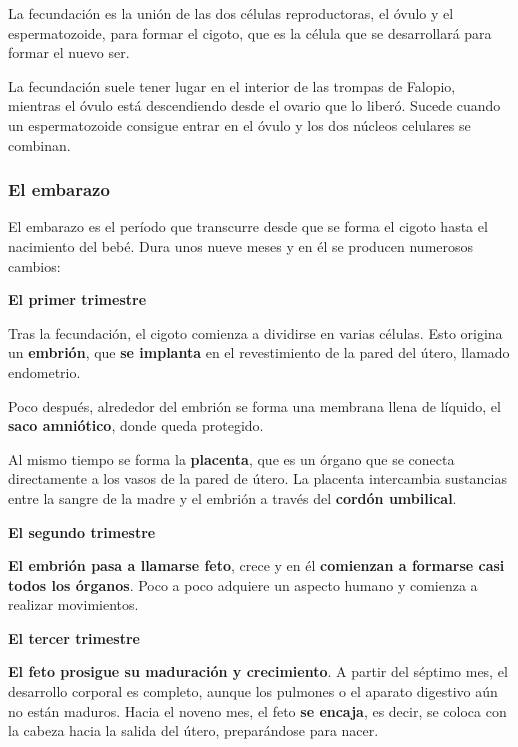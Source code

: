 La fecundación es la unión de las dos células reproductoras, el óvulo y el espermatozoide, para formar el cigoto, que es la célula que se desarrollará para formar el nuevo ser.

\vspace{3mm}
La fecundación suele tener lugar en el interior de las trompas de Falopio, mientras el óvulo está descendiendo desde el ovario que lo liberó. Sucede cuando un espermatozoide consigue entrar en el óvulo y los dos núcleos celulares se combinan.

\subsubsection{El embarazo}

El embarazo es el período que transcurre desde que se forma el cigoto hasta el nacimiento del bebé. Dura unos nueve meses y en él se producen numerosos cambios:

\vspace{3mm}
\textbf{El primer trimestre}

\vspace{3mm}
Tras la fecundación, el cigoto comienza a dividirse en varias células. Esto origina un \textbf{embrión}, que \textbf{se implanta} en el revestimiento de la pared del útero, llamado endometrio.

\vspace{3mm}
Poco después, alrededor del embrión se forma una membrana llena de líquido, el \textbf{saco amniótico}, donde queda protegido.

\vspace{3mm}
Al mismo tiempo se forma la \textbf{placenta}, que es un órgano que se conecta directamente a los vasos de la pared de útero. La placenta intercambia sustancias entre la sangre de la madre y el embrión a través del \textbf{cordón umbilical}.

\vspace{3mm}
\textbf{El segundo trimestre}

\vspace{3mm}
\textbf{El embrión pasa a llamarse feto}, crece y en él \textbf{comienzan a formarse casi todos los órganos}. Poco a poco adquiere un aspecto humano y comienza a realizar movimientos.

\vspace{3mm}
\textbf{El tercer trimestre}

\vspace{3mm}
\textbf{El feto prosigue su maduración y crecimiento}. A partir del séptimo mes, el desarrollo corporal es completo, aunque los pulmones o el aparato digestivo aún no están maduros. Hacia el noveno mes, el feto \textbf{se encaja}, es decir, se coloca con la cabeza hacia la salida del útero, preparándose para nacer.

